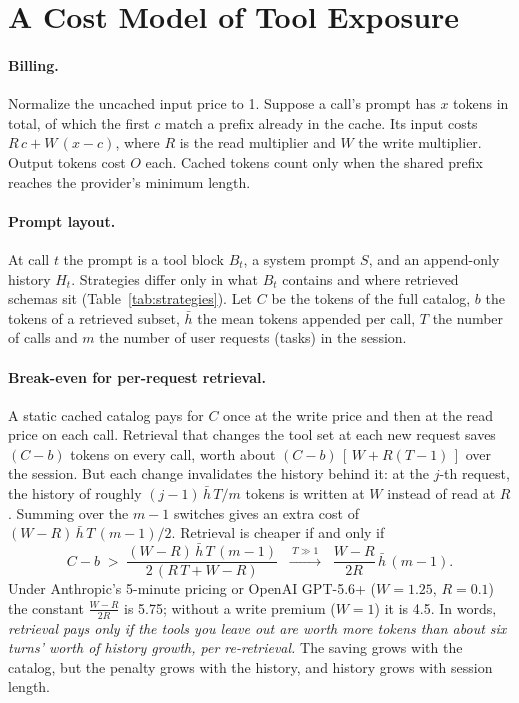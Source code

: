 \documentclass[11pt]{article}
\begin{document}
\section{A Cost Model of Tool Exposure}
\label{sec:model}
\paragraph{Billing.} Normalize the uncached input price to 1. Suppose a call's prompt has $x$ tokens in total, of which the first $c$ match a prefix already in the cache. Its input costs $R\,c + W\,(x-c)$, where $R$ is the read multiplier and $W$ the write multiplier. Output tokens cost $O$ each. Cached tokens count only when the shared prefix reaches the provider's minimum length.

\paragraph{Prompt layout.} At call $t$ the prompt is a tool block $B_t$, a system prompt $S$, and an append-only history $H_t$. Strategies differ only in what $B_t$ contains and where retrieved schemas sit (Table~\ref{tab:strategies}). Let $C$ be the tokens of the full catalog, $b$ the tokens of a retrieved subset, $\bar h$ the mean tokens appended per call, $T$ the number of calls and $m$ the number of user requests (tasks) in the session.

\paragraph{Break-even for per-request retrieval.} A static cached catalog pays for $C$ once at the write price and then at the read price on each call. Retrieval that changes the tool set at each new request saves $(C-b)$ tokens on every call, worth about $(C-b)\,[\,W + R(T-1)\,]$ over the session. But each change invalidates the history behind it: at the $j$-th request, the history of roughly $(j-1)\,\bar h\,T/m$ tokens is written at $W$ instead of read at $R$. Summing over the $m-1$ switches gives an extra cost of $(W-R)\,\bar h\,T\,(m-1)/2$. Retrieval is cheaper if and only if
\begin{equation}
C - b \;>\; \frac{(W-R)\,\bar h\,T\,(m-1)}{2\,(R\,T + W - R)} \;\;\xrightarrow{\;T\gg 1\;}\;\; \frac{W-R}{2R}\,\bar h\,(m-1).
\label{eq:breakeven}
\end{equation}
Under Anthropic's 5-minute pricing or OpenAI GPT-5.6+ ($W{=}1.25$, $R{=}0.1$) the constant $\frac{W-R}{2R}$ is 5.75; without a write premium ($W{=}1$) it is 4.5. In words, \emph{retrieval pays only if the tools you leave out are worth more tokens than about six turns' worth of history growth, per re-retrieval.} The saving grows with the catalog, but the penalty grows with the history, and history grows with session length.
\end{document}
